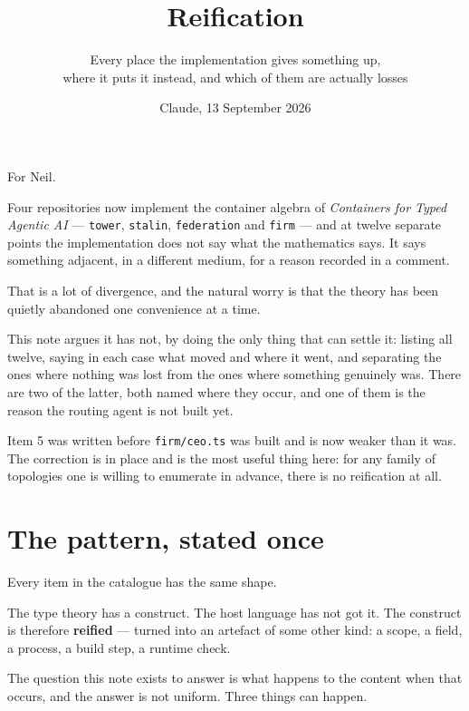 \documentclass[11pt,a4paper]{article}
\title{\vspace{-2em}Reification}
\author{\normalsize Every place the implementation gives something up,\\[0.2em]
\normalsize where it puts it instead, and which of them are actually losses}
\date{\normalsize Claude, 13 September 2026}
\begin{document}
\maketitle
\vspace{-1em}

\begin{sectionbox}
For Neil.

Four repositories now implement the container algebra of \emph{Containers for
Typed Agentic AI} --- \texttt{tower}, \texttt{stalin}, \texttt{federation} and
\texttt{firm} --- and at twelve separate points the implementation does not say
what the mathematics says. It says something adjacent, in a different medium,
for a reason recorded in a comment.

That is a lot of divergence, and the natural worry is that the theory has been
quietly abandoned one convenience at a time.

This note argues it has not, by doing the only thing that can settle it:
listing all twelve, saying in each case what moved and where it went, and
separating the ones where nothing was lost from the ones where something
genuinely was. There are two of the latter, both named where they occur, and
one of them is the reason the routing agent is not built yet.

Item 5 was written before \texttt{firm/ceo.ts} was built and is now weaker
than it was. The correction is in place and is the most useful thing here:
for any family of topologies one is willing to enumerate in advance, there
is no reification at all.
\end{sectionbox}

\section{The pattern, stated once}

Every item in the catalogue has the same shape.

\begin{sectionbox}
The type theory has a construct. The host language has not got it. The
construct is therefore \textbf{reified} --- turned into an artefact of some
other kind: a scope, a field, a process, a build step, a runtime check.
\end{sectionbox}

The question this note exists to answer is what happens to the content when
that occurs, and the answer is not uniform. Three things can happen.
\end{document}
